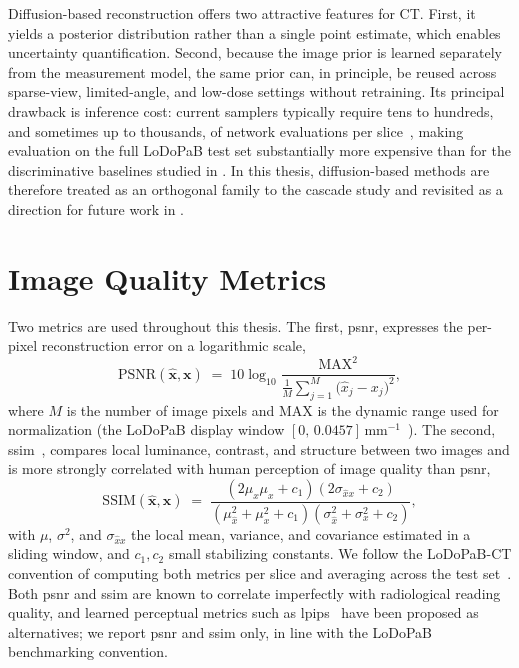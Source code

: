 Diffusion-based reconstruction offers two attractive features for CT. First, it yields a posterior distribution rather than a single point estimate, which enables uncertainty quantification. Second, because the image prior is learned separately from the measurement model, the same prior can, in principle, be reused across sparse-view, limited-angle, and low-dose settings without retraining. Its principal drawback is inference cost: current samplers typically require tens to hundreds, and sometimes up to thousands, of network evaluations per slice~\cite{Ho2020, Yang2024DiffusionSurvey}, making evaluation on the full LoDoPaB test set substantially more expensive than for the discriminative baselines studied in . In this thesis, diffusion-based methods are therefore treated as an orthogonal family to the cascade study and revisited as a direction for future work in .

\section{Image Quality Metrics}
\label{sec:bg_metrics}

Two metrics are used throughout this thesis. The first, \gls{psnr}, expresses the per-pixel reconstruction error on a logarithmic scale,
\begin{equation}
    \mathrm{PSNR}(\hat{\boldsymbol{x}},\boldsymbol{x})
    \;=\; 10 \log_{10}\!\frac{\mathrm{MAX}^{2}}{\frac{1}{M}\sum_{j=1}^{M}\bigl(\hat{x}_{j} - x_{j}\bigr)^{2}},
    \label{eq:psnr}
\end{equation}
where $M$ is the number of image pixels and $\mathrm{MAX}$ is the dynamic range used for normalization (the LoDoPaB display window
$[0,\,0.0457]\,\mathrm{mm}^{-1}$~\cite{Leuschner2021}). The second, \gls{ssim}~\cite{Wang2004}, compares local luminance, contrast, and structure between two images and is more strongly correlated with human perception of image quality than \gls{psnr},
\begin{equation}
    \mathrm{SSIM}(\hat{\boldsymbol{x}},\boldsymbol{x})
    \;=\; \frac{(2\mu_{\hat{x}}\mu_{x} + c_{1})(2\sigma_{\hat{x}x} + c_{2})}
              {(\mu_{\hat{x}}^{2} + \mu_{x}^{2} + c_{1})(\sigma_{\hat{x}}^{2} + \sigma_{x}^{2} + c_{2})},
    \label{eq:ssim}
\end{equation}
with $\mu$, $\sigma^{2}$, and $\sigma_{\hat{x}x}$ the local mean, variance, and covariance estimated in a sliding window, and $c_{1}, c_{2}$ small stabilizing constants.
We follow the LoDoPaB-CT convention of computing both metrics per slice and averaging across the test set~\cite{Leuschner2021, Kiss2024}.  Both \gls{psnr} and \gls{ssim}
are known to correlate imperfectly with radiological reading quality, and learned perceptual metrics such as \gls{lpips}~\cite{Zhang2018LPIPS} have been proposed as alternatives; we report \gls{psnr} and \gls{ssim} only, in line with the LoDoPaB benchmarking convention.

